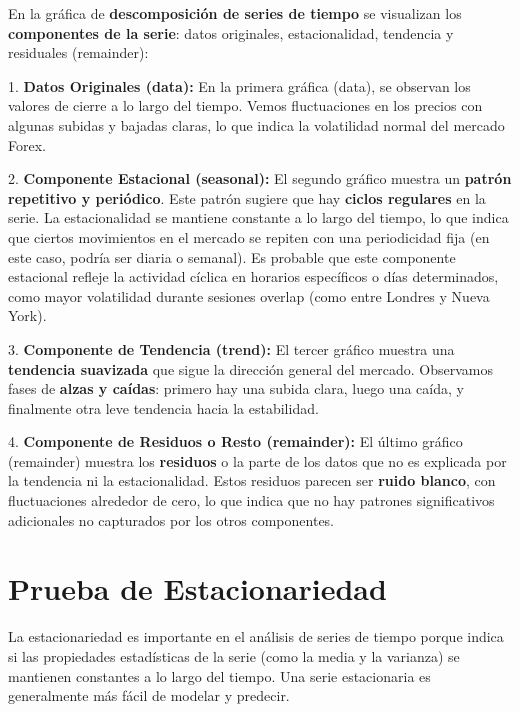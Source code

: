 \documentclass[
]{book}
\begin{document}
En la gráfica de \textbf{descomposición de series de tiempo} se visualizan los \textbf{componentes de la serie}: datos originales, estacionalidad, tendencia y residuales (remainder):

1. \textbf{Datos Originales (data):} En la primera gráfica (data), se observan los valores de cierre a lo largo del tiempo. Vemos fluctuaciones en los precios con algunas subidas y bajadas claras, lo que indica la volatilidad normal del mercado Forex.

2. \textbf{Componente Estacional (seasonal):} El segundo gráfico muestra un \textbf{patrón repetitivo y periódico}. Este patrón sugiere que hay \textbf{ciclos regulares} en la serie. La estacionalidad se mantiene constante a lo largo del tiempo, lo que indica que ciertos movimientos en el mercado se repiten con una periodicidad fija (en este caso, podría ser diaria o semanal). Es probable que este componente estacional refleje la actividad cíclica en horarios específicos o días determinados, como mayor volatilidad durante sesiones overlap (como entre Londres y Nueva York).

3. \textbf{Componente de Tendencia (trend):} El tercer gráfico muestra una \textbf{tendencia suavizada} que sigue la dirección general del mercado. Observamos fases de \textbf{alzas y caídas}: primero hay una subida clara, luego una caída, y finalmente otra leve tendencia hacia la estabilidad.

4. \textbf{Componente de Residuos o Resto (remainder):} El último gráfico (remainder) muestra los \textbf{residuos} o la parte de los datos que no es explicada por la tendencia ni la estacionalidad. Estos residuos parecen ser \textbf{ruido blanco}, con fluctuaciones alrededor de cero, lo que indica que no hay patrones significativos adicionales no capturados por los otros componentes.

\section{Prueba de Estacionariedad}\label{prueba-de-estacionariedad}

La estacionariedad es importante en el análisis de series de tiempo porque indica si las propiedades estadísticas de la serie (como la media y la varianza) se mantienen constantes a lo largo del tiempo. Una serie estacionaria es generalmente más fácil de modelar y predecir.
\end{document}
